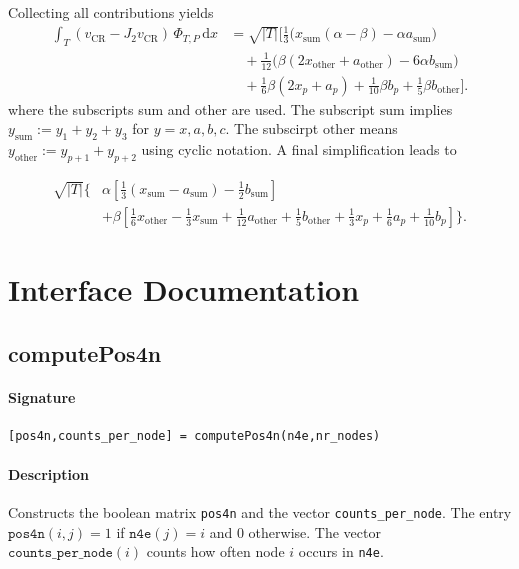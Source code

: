 \documentclass[11pt,a4paper]{article}
\newcommand{\dx}{\,\mathrm{d}x}
\begin{document}
Collecting all contributions yields
\begin{align*}
\int_T (v_{\mathrm{CR}} - J_2 v_{\mathrm{CR}})\,\Phi_{T,P} \dx
&=
\sqrt{|T|}
\Bigg[
\frac{1}{3}\bigl(x_{\mathrm{sum}}(\alpha-\beta)
                 - \alpha a_{\mathrm{sum}}\bigr) \\
&\quad
+ \frac{1}{12}
\bigl(\beta(2x_{\mathrm{other}} + a_{\mathrm{other}})
      - 6\alpha b_{\mathrm{sum}}\bigr) \\
&\quad
+ \frac{1}{6}\beta(2x_p + a_p)
+ \frac{1}{10}\beta b_p
+ \frac{1}{5}\beta b_{\mathrm{other}}
\Bigg].
\end{align*}
where the subscripts sum and other are used. The subscript \(\mathrm{sum}\) implies \(y_\mathrm{sum} := y_1 + y_2 + y_3\) for \(y=x,a,b,c\). The subscirpt \(\mathrm{other}\) means \(y_\mathrm{other} := y_{p+1} + y_{p+2}\) using cyclic notation.
A final simplification leads to 

\begin{equation}
\label{formula for j3 coefficient}
\begin{aligned}
\sqrt{|T|}
\Bigg\{
&\alpha\left[\frac{1}{3}\left(x_{\mathrm{sum}}-a_{\mathrm{sum}}\right)-\frac{1}{2}b_{\mathrm{sum}}\right] \\
&+\beta\left[\frac{1}{6}x_{\mathrm{other}}-\frac{1}{3}x_{\mathrm{sum}}+\frac{1}{12}a_{\mathrm{other}}+\frac{1}{5}b_{\mathrm{other}}+\frac{1}{3}x_{p}+\frac{1}{6}a_{p}+\frac{1}{10}b_{p}\right]
\Bigg\}.
\end{aligned}
\end{equation}

\section{Interface Documentation}

\subsection{computePos4n}

\paragraph{Signature}
\begin{verbatim}
[pos4n,counts_per_node] = computePos4n(n4e,nr_nodes)
\end{verbatim}

\paragraph{Description}
Constructs the boolean matrix \texttt{pos4n} and the vector 
\texttt{counts\_per\_node}. 
The entry $\texttt{pos4n}(i,j)=1$ if $\texttt{n4e}(j)=i$ and $0$ otherwise. 
The vector $\texttt{counts\_per\_node}(i)$ counts how often node $i$ occurs in 
\texttt{n4e}.
\end{document}
